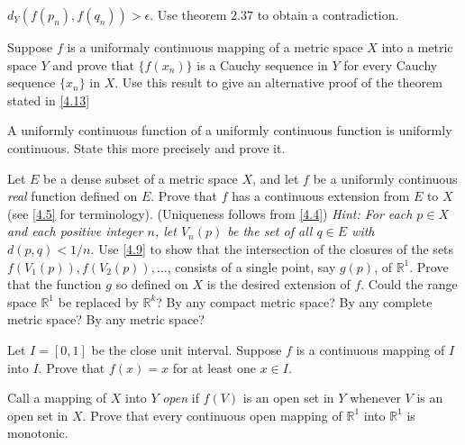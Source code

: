 \begin{exercise}
  \(d_Y(f(p_n),f(q_n)) > \epsilon\).
  Use theorem \(2.37\) to obtain a contradiction.
\item
  Suppose \(f\) is a uniformaly continuous mapping of a metric space \(X\)
  into a metric space \(Y\) and prove that \(\{f(x_n)\}\) is a Cauchy sequence
  in \(Y\) for every Cauchy sequence \(\{x_n\}\) in \(X\).
  Use this result to give an alternative proof of the theorem stated in
  \cref{4.13}
\item
  A uniformly continuous function of a uniformly continuous function is
  uniformly continuous.
  State this more precisely and prove it.
\item
  \label{4.13}
  Let \(E\) be a dense subset of a metric space \(X\), and let \(f\) be a
  uniformly continuous \textit{real} function defined on \(E\).
  Prove that \(f\) has a continuous extension from \(E\) to \(X\)
  (see \cref{4.5} for terminology).
  (Uniqueness follows from \cref{4.4})
  \textit{Hint: For each \(p\in X\) and each positive integer \(n\), let
    \(V_n(p)\) be the set of all \(q\in E\) with \(d(p,q) < 1/n\).}
  Use \cref{4.9} to show that the intersection of the closures of the sets
  \(f(V_1(p)),f(V_2(p)),\ldots\), consists of a single point, say \(g(p)\), of
  \(\mathbb{R}^1\).
  Prove that the function \(g\) so defined on \(X\) is the desired extension
  of \(f\).
  Could the range space \(\mathbb{R}^1\) be replaced by \(\mathbb{R}^k\)?
  By any compact metric space?
  By any complete metric space?
  By any metric space?
\item
  Let \(I = [0,1]\) be the close unit interval.
  Suppose \(f\) is a continuous mapping of \(I\) into \(I\).
  Prove that \(f(x) = x\) for at least one \(x\in I\).
\item
  Call a mapping of \(X\) into \(Y\) \textit{open} if \(f(V)\) is an open set
  in \(Y\) whenever \(V\) is an open set in \(X\).
  Prove that every continuous open mapping of \(\mathbb{R}^1\) into
  \(\mathbb{R}^1\) is monotonic.
\end{exercise}

